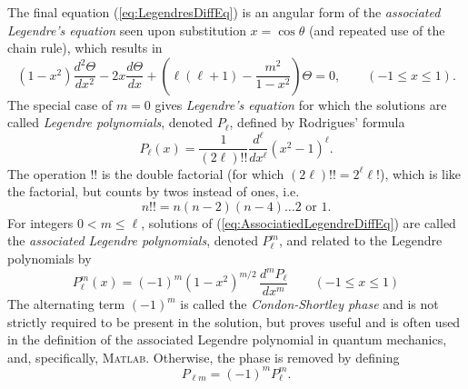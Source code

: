 \documentclass[11pt,dvipsnames]{thesis}
\begin{document}
The final equation (\ref{eq:LegendresDiffEq}) is an angular form of the \textit{associated Legendre's equation} seen upon substitution $x = \cos\theta$ (and repeated use of the chain rule), which results in
\begin{equation}
(1 - x^2) \frac{d^2 \Theta}{dx^2} - 2x \frac{d\Theta}{dx} + \left(\ell(\ell + 1) - \frac{m^2}{1 - x^2}\right) \Theta = 0, \qquad (-1 \leqslant x \leqslant 1). \label{eq:AssociatiedLegendreDiffEq}
\end{equation}
The special case of $m = 0$ gives \textit{Legendre's equation} for which the solutions are called \textit{Legendre polynomials}, denoted $P_\ell$, defined by Rodrigues' formula
\begin{equation}
P_\ell(x) = \frac{1}{(2\ell)!!} \frac{d^\ell}{dx^\ell} (x^2 - 1)^\ell.
\end{equation}
The operation $!!$ is the double factorial (for which $(2\ell)!! = 2^\ell \ell!$), which is like the factorial, but counts by twos instead of ones, i.e.
\begin{equation}
n!! = n(n-2)(n-4)\ldots 2 \text{ or } 1.
\end{equation}
For integers $0 < m \leqslant \ell$, solutions of (\ref{eq:AssociatiedLegendreDiffEq}) are called the \textit{associated Legendre polynomials}, denoted $P_\ell^m$, and related to the Legendre polynomials by
\begin{equation}
P_\ell^m(x) = (-1)^m (1 - x^2)^{m/2}\,\frac{d^m P_\ell}{dx^m} \qquad (-1 \leqslant x \leqslant 1)
\end{equation}
The alternating term $(-1)^m$ is called the \textit{Condon-Shortley phase} and is not strictly required to be present in the solution, but proves useful and is often used in the definition of the associated Legendre polynomial in quantum mechanics, and, specifically, \textsc{Matlab}. Otherwise, the phase is removed by defining
\begin{equation}
P_{\ell m} = (-1)^m P_\ell^m.
\end{equation}
\end{document}
